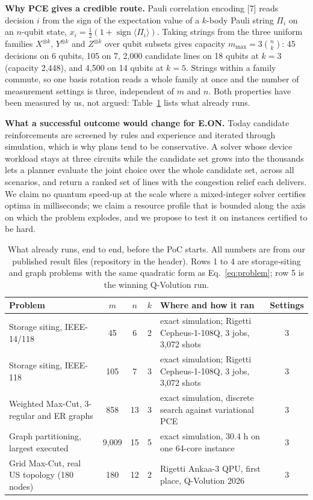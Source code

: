 \documentclass[10pt,a4paper]{article}
\begin{document}
\textbf{Why PCE gives a credible route.} Pauli correlation encoding [7] reads
decision $i$ from the sign of the expectation value of a $k$-body Pauli string
$\Pi_i$ on an $n$-qubit state, $x_i=\tfrac12(1+\operatorname{sign}\langle\Pi_i\rangle)$.
Taking strings from the three uniform families $X^{\otimes k}$, $Y^{\otimes k}$
and $Z^{\otimes k}$ over qubit subsets gives capacity $m_{\max}=3\binom{n}{k}$:
45 decisions on 6 qubits, 105 on 7, 2,000 candidate lines on 18 qubits at
$k=3$ (capacity 2,448), and 4,500 on 14 qubits at $k=5$. Strings within a family commute, so
one basis rotation reads a whole family at once and the number of measurement
settings is three, independent of $m$ and $n$. Both properties have been
measured by us, not argued: Table~\ref{tab:evidence} lists what already runs.

\textbf{What a successful outcome would change for E.ON.} Today candidate
reinforcements are screened by rules and experience and iterated through
simulation, which is why plans tend to be conservative. A solver whose device
workload stays at three circuits while the candidate set grows into the
thousands lets a planner evaluate the joint choice over the whole candidate
set, across all scenarios, and return a ranked set of lines with the
congestion relief each delivers. We claim no quantum speed-up at the scale
where a mixed-integer solver certifies optima in milliseconds; we claim a
resource profile that is bounded along the axis on which the problem explodes,
and we propose to test it on instances certified to be hard.

\begin{table}[t]
\centering
\caption{What already runs, end to end, before the PoC starts. All numbers are
from our published result files (repository in the header). Rows 1 to 4 are
storage-siting and graph problems with the same quadratic form as
Eq.~\eqref{eq:problem}; row 5 is the winning Q-Volution run.}
\label{tab:evidence}
\begin{tabularx}{\textwidth}{@{}lcccXc@{}}
\toprule
Problem & $m$ & $n$ & $k$ & Where and how it ran & Settings \\
\midrule
Storage siting, IEEE-14/118 & 45 & 6 & 2 & exact simulation; Rigetti Cepheus-1-108Q, 3 jobs, 3,072 shots & 3 \\
Storage siting, IEEE-118 & 105 & 7 & 3 & exact simulation; Rigetti Cepheus-1-108Q, 3 jobs, 3,072 shots & 3 \\
Weighted Max-Cut, 3-regular and ER graphs & 858 & 13 & 3 & exact simulation, discrete search against variational PCE & 3 \\
Graph partitioning, largest executed & 9,009 & 15 & 5 & exact simulation, 30.4 h on one 64-core instance & 3 \\
Grid Max-Cut, real US topology (180 nodes) & 180 & 12 & 2 & Rigetti Ankaa-3 QPU, first place, Q-Volution 2026 & 3 \\
\bottomrule
\end{tabularx}
\end{table}
\end{document}
